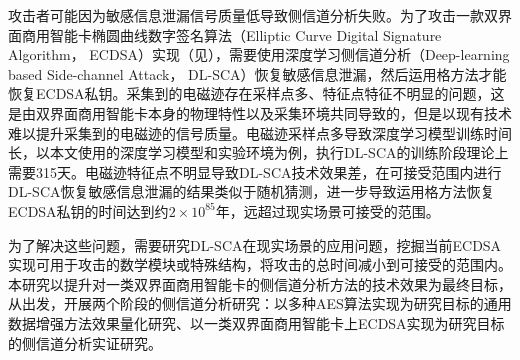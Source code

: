 {	%
	
	{\color{\xchange} 
		
	攻击者可能因为敏感信息泄漏信号质量低导致侧信道分析失败。为了攻击一款双界面商用智能卡椭圆曲线数字签名算法（Elliptic Curve Digital Signature Algorithm， ECDSA）实现（见），需要使用深度学习侧信道分析（Deep-learning based Side-channel Attack， DL-SCA）恢复敏感信息泄漏，然后运用格方法才能恢复ECDSA私钥。采集到的电磁迹存在采样点多、特征点特征不明显的问题，这是由双界面商用智能卡本身的物理特性以及采集环境共同导致的，但是以现有技术难以提升采集到的电磁迹的信号质量。电磁迹采样点多导致深度学习模型训练时间长，以本文使用的深度学习模型和实验环境为例，执行DL-SCA的训练阶段理论上需要315天。电磁迹特征点不明显导致DL-SCA技术效果差，在可接受范围内进行DL-SCA恢复敏感信息泄漏的结果类似于随机猜测，进一步导致运用格方法恢复ECDSA私钥的时间达到约$2\times10^{85}$年，远超过现实场景可接受的范围。
	
	为了解决这些问题，需要研究DL-SCA在现实场景的应用问题，挖掘当前ECDSA实现可用于攻击的数学模块或特殊结构，将攻击的总时间减小到可接受的范围内。本研究以提升对一类双界面商用智能卡的侧信道分析方法的技术效果为最终目标，从\jiaodu 出发，开展两个阶段的侧信道分析研究：以多种AES算法实现为研究目标的通用数据增强方法效果量化研究、以一类双界面商用智能卡上ECDSA实现为研究目标的侧信道分析实证研究。
	}
	
}
